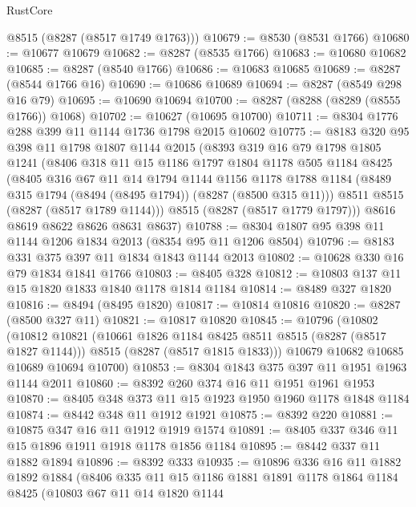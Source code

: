 \begin{lexlean}{RustCore}
\begin{coremodule}
      @8515
      (@8287 (@8517 @1749 @1763)))
@10679 := @8530 (@8531 @1766)
@10680 := @10677 @10679
@10682 := @8287 (@8535 @1766)
@10683 := @10680 @10682
@10685 := @8287 (@8540 @1766)
@10686 := @10683 @10685
@10689 := @8287 (@8544 @1766 @16)
@10690 := @10686 @10689
@10694 := @8287 (@8549 @298 @16 @79)
@10695 := @10690 @10694
@10700 := @8287 (@8288 (@8289 (@8555 @1766)) @1068)
@10702 := @10627 (@10695 @10700)
@10711 := @8304 @1776 @288 @399 @11 @1144 @1736 @1798 @2015 @10602
@10775 := @8183
    @320
    @95
    @398
    @11
    @1798
    @1807
    @1144
    @2015
    (@8393
      @319
      @16
      @79
      @1798
      @1805
      @1241
      (@8406
        @318
        @11
        @15
        @1186
        @1797
        @1804
        @1178
        @505
        @1184
        @8425
        (@8405
          @316
          @67
          @11
          @14
          @1794
          @1144
          @1156
          @1178
          @1788
          @1184
          (@8489 @315 @1794 (@8494 (@8495 @1794)) (@8287 (@8500 @315 @11)))
          @8511
          @8515
          (@8287 (@8517 @1789 @1144)))
        @8515
        (@8287 (@8517 @1779 @1797)))
      @8616
      @8619
      @8622
      @8626
      @8631
      @8637)
@10788 := @8304 @1807 @95 @398 @11 @1144 @1206 @1834 @2013 (@8354 @95 @11 @1206 @8504)
@10796 := @8183 @331 @375 @397 @11 @1834 @1843 @1144 @2013
@10802 := @10628 @330 @16 @79 @1834 @1841 @1766
@10803 := @8405 @328
@10812 := @10803 @137 @11 @15 @1820 @1833 @1840 @1178 @1814 @1184
@10814 := @8489 @327 @1820
@10816 := @8494 (@8495 @1820)
@10817 := @10814 @10816
@10820 := @8287 (@8500 @327 @11)
@10821 := @10817 @10820
@10845 := @10796
    (@10802
      (@10812
        @10821
        (@10661 @1826 @1184 @8425 @8511 @8515 (@8287 (@8517 @1827 @1144)))
        @8515
        (@8287 (@8517 @1815 @1833)))
      @10679
      @10682
      @10685
      @10689
      @10694
      @10700)
@10853 := @8304 @1843 @375 @397 @11 @1951 @1963 @1144 @2011
@10860 := @8392 @260 @374 @16 @11 @1951 @1961 @1953
@10870 := @8405 @348 @373 @11 @15 @1923 @1950 @1960 @1178 @1848 @1184
@10874 := @8442 @348 @11 @1912 @1921
@10875 := @8392 @220
@10881 := @10875 @347 @16 @11 @1912 @1919 @1574
@10891 := @8405 @337 @346 @11 @15 @1896 @1911 @1918 @1178 @1856 @1184
@10895 := @8442 @337 @11 @1882 @1894
@10896 := @8392 @333
@10935 := @10896
    @336
    @16
    @11
    @1882
    @1892
    @1884
    (@8406
      @335
      @11
      @15
      @1186
      @1881
      @1891
      @1178
      @1864
      @1184
      @8425
      (@10803
        @67
        @11
        @14
        @1820
        @1144

\end{coremodule}
\end{lexlean}
